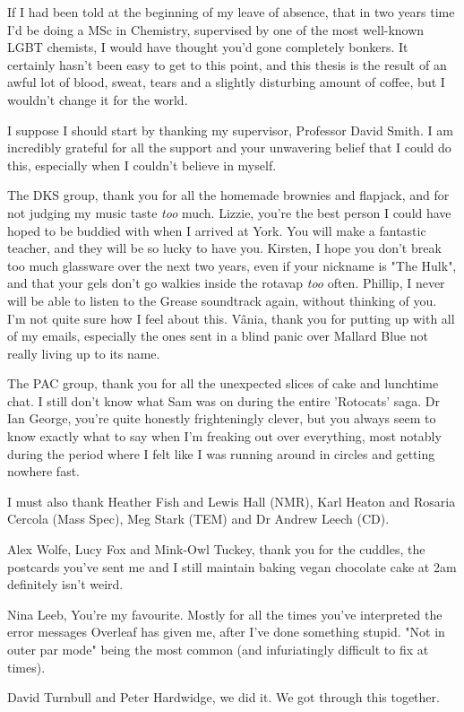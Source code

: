 \documentclass[
12pt, %
english, %
onehalfspacing, %
parskip, %
headsepline, %
]{MastersDoctoralThesis} %
\begin{document}
\begin{acknowledgements}
\addchaptertocentry{\acknowledgementname} 
\raggedright

If I had been told at the beginning of my leave of absence, that in two years time I'd be doing a MSc in Chemistry, supervised by one of the most well-known LGBT chemists, I would have thought you'd gone completely bonkers. It certainly hasn't been easy to get to this point, and this thesis is the result of an awful lot of blood, sweat, tears and a slightly disturbing amount of coffee, but I wouldn't change it for the world. 

I suppose I should start by thanking my supervisor, Professor David Smith. I am incredibly grateful for all the support and your unwavering belief that I could do this, especially when I couldn't believe in myself. 

The DKS group,  thank you for all the homemade brownies and flapjack, and for not judging my music taste \textit{too} much.  
\newline
Lizzie, you're the best person I could have hoped to be buddied with when I arrived at York. You will make a fantastic teacher, and they will be so lucky to have you. 
\newline
Kirsten, I hope you don't break too much glassware over the next two years, even if your nickname is  "The Hulk", and that your gels don't go walkies inside the rotavap \textit{too} often.  
\newline
Phillip, I never will be able to listen to the Grease soundtrack again, without thinking of you. I'm not quite sure how I feel about this. 
\newline
V\^{a}nia, thank you for putting up with all of my emails, especially the ones sent in a blind panic over Mallard Blue not really living up to its name. 

The PAC group, thank you for all the unexpected slices of cake and lunchtime chat. I still don't know what Sam was on during the entire 'Rotocats' saga.  Dr Ian George, you're quite honestly frighteningly clever, but you always seem to know exactly what to say when I'm freaking out over everything, most notably during the period where I felt like I was running around in circles and getting nowhere fast.

I must also thank Heather Fish and Lewis Hall (NMR), Karl Heaton and Rosaria Cercola (Mass Spec), Meg Stark (TEM) and Dr Andrew Leech (CD).

Alex Wolfe, Lucy Fox and Mink-Owl Tuckey, thank you for the cuddles, the postcards you've sent me and I still maintain baking vegan chocolate cake at 2am definitely isn't weird.  

Nina Leeb, You're my favourite. Mostly for all the times you've interpreted the error messages Overleaf has given me, after I've done something stupid. "Not in outer par mode" being the most common (and infuriatingly difficult to fix at times).

David Turnbull and Peter Hardwidge, we did it. We got through this together. 

\end{acknowledgements}
\end{document}
